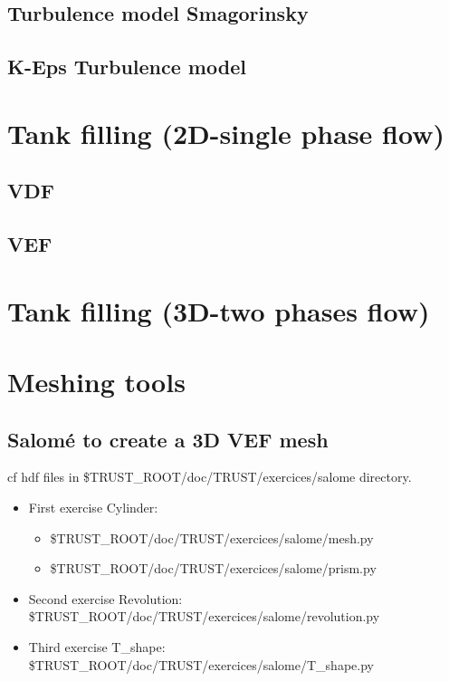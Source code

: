 \documentclass[english]{article}
\begin{document}
\subsection{Turbulence model Smagorinsky}

\subsection{K-Eps Turbulence model}


\section{Tank filling (2D-single phase flow)}
\subsection{VDF}

\subsection{VEF}


\section{Tank filling (3D-two phases flow)}


\newpage
\section{Meshing tools}
\subsection{Salom\'e to create a 3D VEF mesh}
cf hdf files in \$TRUST\_ROOT/doc/TRUST/exercices/salome directory.
\begin{itemize}
\item First exercise Cylinder:
\begin{itemize}
\item \$TRUST\_ROOT/doc/TRUST/exercices/salome/mesh.py
\item \$TRUST\_ROOT/doc/TRUST/exercices/salome/prism.py
\end{itemize}
\item Second exercise Revolution:\\
\$TRUST\_ROOT/doc/TRUST/exercices/salome/revolution.py
\item Third exercise T\_shape:\\
\$TRUST\_ROOT/doc/TRUST/exercices/salome/T\_shape.py
\end{itemize}
\end{document}

